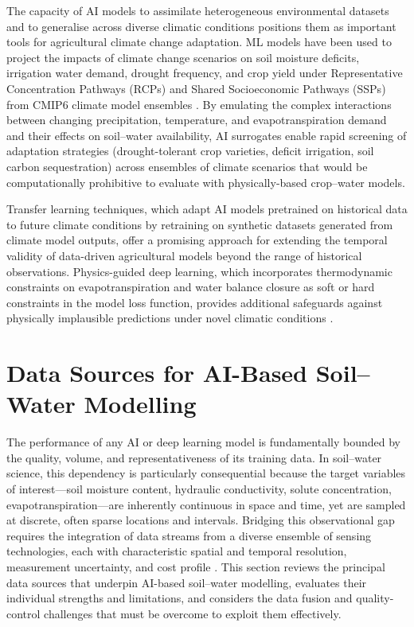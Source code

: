 \documentclass[land,article,submit,pdftex,moreauthors]{Definitions/mdpi}
\numberwithin{equation}{section}
\begin{document}
The capacity of AI models to assimilate heterogeneous environmental datasets and to generalise across diverse climatic conditions positions them as important tools for agricultural climate change adaptation. ML models have been used to project the impacts of climate change scenarios on soil moisture deficits, irrigation water demand, drought frequency, and crop yield under Representative Concentration Pathways (RCPs) and Shared Socioeconomic Pathways (SSPs) from CMIP6 climate model ensembles \citep{trnka2022soil}. By emulating the complex interactions between changing precipitation, temperature, and evapotranspiration demand and their effects on soil--water availability, AI surrogates enable rapid screening of adaptation strategies (drought-tolerant crop varieties, deficit irrigation, soil carbon sequestration) across ensembles of climate scenarios that would be computationally prohibitive to evaluate with physically-based crop--water models.

Transfer learning techniques, which adapt AI models pretrained on historical data to future climate conditions by retraining on synthetic datasets generated from climate model outputs, offer a promising approach for extending the temporal validity of data-driven agricultural models beyond the range of historical observations. Physics-guided deep learning, which incorporates thermodynamic constraints on evapotranspiration and water balance closure as soft or hard constraints in the model loss function, provides additional safeguards against physically implausible predictions under novel climatic conditions \citep{willard2022integrating}.


\section{Data Sources for AI-Based Soil--Water Modelling}

The performance of any AI or deep learning model is fundamentally bounded by the quality, volume, and representativeness of its training data. In soil--water science, this dependency is particularly consequential because the target variables of interest---soil moisture content, hydraulic conductivity, solute concentration, evapotranspiration---are inherently continuous in space and time, yet are sampled at discrete, often sparse locations and intervals. Bridging this observational gap requires the integration of data streams from a diverse ensemble of sensing technologies, each with characteristic spatial and temporal resolution, measurement uncertainty, and cost profile \citep{jensen2019soil, yang2023physics}. This section reviews the principal data sources that underpin AI-based soil--water modelling, evaluates their individual strengths and limitations, and considers the data fusion and quality-control challenges that must be overcome to exploit them effectively.
\end{document}

